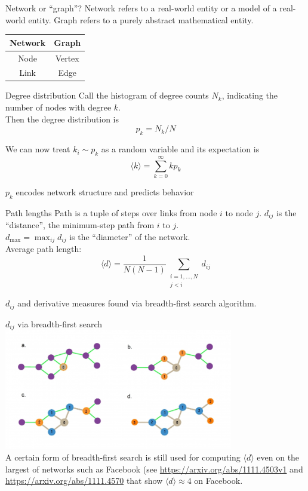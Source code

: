 \documentclass[notes]{beamer}
\begin{document}
\begin{frame}{Network or ``graph''?}
  Network refers to a real-world entity or a model of a real-world entity. 
  Graph refers to a purely abstract mathematical entity. \\[2em]

  \centering
  \begin{tabular}{cc}
    \textbf{Network} & \textbf{Graph} \\
    \hline
    Node & Vertex \\
    Link & Edge 
  \end{tabular}
\end{frame}

\begin{frame}{Degree distribution}
  Call the histogram of degree counts $N_k$, indicating the number of nodes
  with degree $k$. \\[1em]

  Then the degree distribution is
  \[ p_k = N_k / N \]

  We can now treat $k_i \sim p_k$ as a random variable and its expectation is
  \[ \langle k \rangle = \sum_{k=0}^\infty k p_k \]

  $p_k$ encodes network structure and predicts behavior
\end{frame}



\begin{frame}{Path lengths}
  Path is a tuple of steps over links from node $i$ to node $j$. 
  $d_{ij}$ is the ``distance'', the minimum-step path from $i$ to $j$. \\[1em]
  $d_\text{max} = \max_{ij} d_{ij}$ is the ``diameter'' of the network.  \\[1em]

  Average path length:
  \[ \langle d \rangle = \frac{1}{N(N-1)} \sum_{\substack{i=1,\ldots,N \\ j < i}} d_{ij} \]
  
  $d_{ij}$ and derivative measures found via breadth-first search algorithm.
\end{frame}

\begin{frame}{$d_{ij}$ via breadth-first search}
  \centering
  \includegraphics[width=0.75\textwidth]{Figures/bfs.jpg} \\
  A certain form of breadth-first search is still used for computing 
  $\langle d \rangle$ even on the largest of networks such as Facebook
  (see \url{https://arxiv.org/abs/1111.4503v1} and 
  \url{https://arxiv.org/abs/1111.4570} that show $\langle d \rangle \approx 4$
  on Facebook.
\end{frame}
\end{document}
